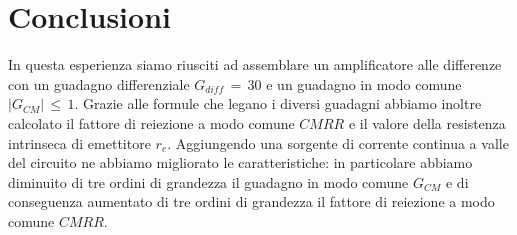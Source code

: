 \section{Conclusioni}

In questa esperienza siamo riusciti ad assemblare un amplificatore alle differenze con un guadagno differenziale $G_{diff} \,=\, 30$ e un guadagno in modo comune $\left| G_{CM} \right| \,\leq\, 1$.
Grazie alle formule che legano i diversi guadagni abbiamo inoltre calcolato il fattore di reiezione a modo comune $CMRR$ e il valore della resistenza intrinseca di emettitore $r_e$.
Aggiungendo una sorgente di corrente continua a valle del circuito ne abbiamo migliorato le caratteristiche: in particolare abbiamo diminuito di tre ordini di grandezza il guadagno in modo comune $G_{CM}$ e di conseguenza aumentato di tre ordini di grandezza il fattore di reiezione a modo comune $CMRR$.